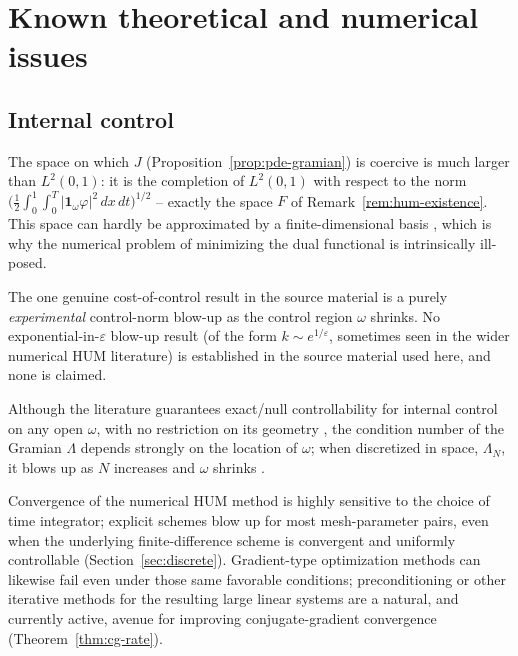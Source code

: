 \section{Known theoretical and numerical issues}
\label{sec:known-issues}

\subsection{Internal control}

\begin{remark}
  \label{rem:coercivity-space}
  The space on which $J$ (Proposition~\ref{prop:pde-gramian}) is coercive is
  much larger than $L^2(0,1)$: it is the completion of $L^2(0,1)$ with respect
  to the norm
  $\big(\tfrac12\int_0^1\!\int_0^T|\mathbf{1}_\omega\varphi|^2\,dx\,dt\big)^{1/2}$
  -- exactly the space $F$ of Remark~\ref{rem:hum-existence}. This space can
  hardly be approximated by a finite-dimensional basis
  \citep{munch2010numerical}, which is why the numerical problem of minimizing
  the dual functional is intrinsically ill-posed.
\end{remark}

The one genuine cost-of-control result in the source material is a purely
\emph{experimental} control-norm blow-up as the control region $\omega$
shrinks. No exponential-in-$\varepsilon$ blow-up result (of the form
$k\sim e^{1/\varepsilon}$, sometimes seen in the wider numerical HUM
literature) is established in the source material used here, and none is
claimed.

\begin{remark}
  \label{rem:gramian-geometry}
  Although the literature guarantees exact/null controllability for
  internal control on any open $\omega$, with no restriction on its geometry
  \citep{zuazua2002controllability}, the condition number of the Gramian
  $\Lambda$ depends strongly on the location of $\omega$; when discretized in
  space, $\Lambda_N$, it blows up as $N$ increases and $\omega$ shrinks
  \citep{munch2011optimal}.
\end{remark}

\begin{remark}
  Convergence of the numerical HUM method is highly sensitive to the choice
  of time integrator; explicit schemes blow up for most mesh-parameter pairs,
  even when the underlying finite-difference scheme is convergent and
  uniformly controllable (Section~\ref{sec:discrete}). Gradient-type
  optimization methods can likewise fail even under those same favorable
  conditions; preconditioning or other iterative methods for the resulting
  large linear systems are a natural, and currently active, avenue for
  improving conjugate-gradient convergence (Theorem~\ref{thm:cg-rate}).
\end{remark}

